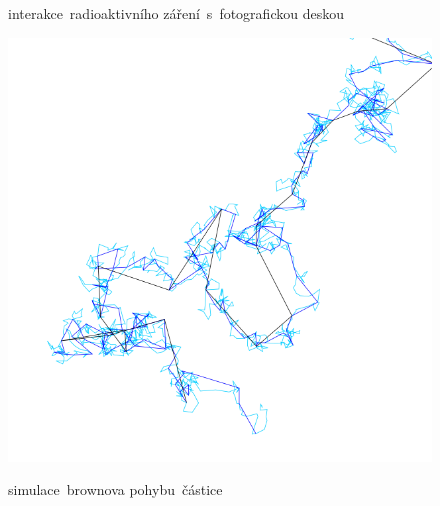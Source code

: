 \documentclass{../../../../style/mkimain}
\begin{document}
\begin{figure}[H]
    \begin{center}
        interakce~radioaktivního záření~s~fotografickou deskou
      \end{center}
  \endminipage\hfill
    \includegraphics[width=\linewidth]{images/brownuv-pohyb.png}
    \begin{center}
        simulace~brownova pohybu~částice
    \end{center}
  \endminipage
\end{figure}
\vspace{0.5cm}
\end{document}
